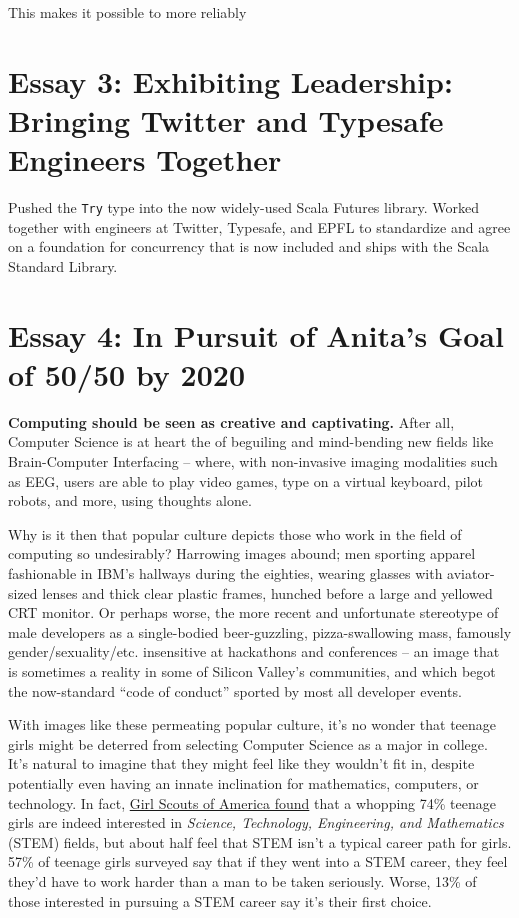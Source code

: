 \documentclass[acmtocl]{acmtrans2m}
\begin{document}
This makes it possible to more reliably


\section*{\textbf{Essay 3:} Exhibiting Leadership: Bringing Twitter and Typesafe Engineers Together}

Pushed the \verb|Try| type into the now widely-used Scala Futures library.
Worked together with engineers at Twitter, Typesafe, and EPFL to standardize
and agree on a foundation for concurrency that is now included and ships with
the Scala Standard Library.

\section*{\textbf{Essay 4:} In Pursuit of Anita's Goal of 50/50 by 2020}

\textbf{Computing should be seen as creative and captivating.}
After all, Computer Science is at heart the of beguiling and mind-bending new
fields like {Brain-Computer} Interfacing -- where, with non-invasive imaging
modalities such as EEG, users are able to play video games, type on a virtual
keyboard, pilot robots, and more, using thoughts alone.

Why is it then that popular culture depicts those who work in the field of
computing so undesirably? Harrowing images abound; men sporting apparel
fashionable in IBM's hallways during the eighties, wearing glasses with
aviator-sized lenses and thick clear plastic frames, hunched before a large
and yellowed CRT monitor. Or perhaps worse, the more recent and unfortunate
stereotype of male developers as a {single-bodied} {beer-guzzling},
{pizza-swallowing} mass, famously gender/sexuality/etc. insensitive at
hackathons and conferences -- an image that is sometimes a reality in
some of Silicon Valley's communities, and which begot the {now-standard} ``code
of conduct'' sported by most all developer events.

With images like these permeating popular culture, it's no wonder that teenage
girls might be deterred from selecting Computer Science as a major in college.
It's natural to imagine that they might feel like they wouldn't fit in,
despite potentially even having an innate inclination for mathematics,
computers, or technology. In fact,
\href{https://www.girlscouts.org/research/pdf/generation\_stem\_full\_report.pdf}{Girl Scouts of America found}
\cite{Girlscouts} that a whopping 74\% teenage girls are indeed interested in {\em
Science, Technology, Engineering, and Mathematics} (STEM) fields, but about
half feel that STEM isn't a typical career path for girls. 57\% of teenage
girls surveyed say that if they went into a STEM career, they feel they'd have
to work harder than a man to be taken seriously. Worse, 13\% of those
interested in pursuing a STEM career say it's their first choice.
\end{document}
